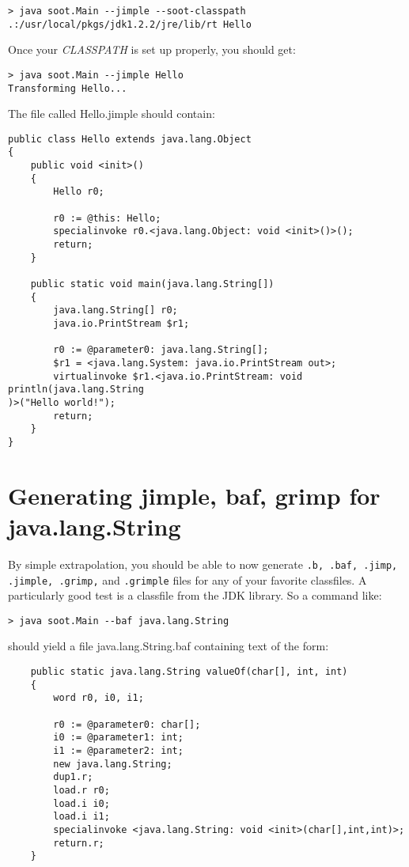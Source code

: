 \documentclass{article}
\begin{document}
\begin{verbatim}
> java soot.Main --jimple --soot-classpath .:/usr/local/pkgs/jdk1.2.2/jre/lib/rt Hello
\end{verbatim}


Once your {\em CLASSPATH} is set up properly, you should get:

\begin{verbatim}
> java soot.Main --jimple Hello
Transforming Hello...
\end{verbatim}

The file called Hello.jimple should contain:

\begin{verbatim}
public class Hello extends java.lang.Object
{
    public void <init>()
    {
        Hello r0;

        r0 := @this: Hello;
        specialinvoke r0.<java.lang.Object: void <init>()>();
        return;
    }

    public static void main(java.lang.String[])
    {
        java.lang.String[] r0;
        java.io.PrintStream $r1;

        r0 := @parameter0: java.lang.String[];
        $r1 = <java.lang.System: java.io.PrintStream out>;
        virtualinvoke $r1.<java.io.PrintStream: void println(java.lang.String
)>("Hello world!");
        return;
    }
}
\end{verbatim}

\section{Generating jimple, baf, grimp for java.lang.String}

By simple extrapolation, you should be able to now generate {\tt .b, .baf,
.jimp, .jimple, .grimp,} and {\tt .grimple} files for any of your favorite
classfiles.  A particularly good test is a classfile from the JDK
library.  So a command like:

\begin{verbatim}
> java soot.Main --baf java.lang.String
\end{verbatim}

should yield a file java.lang.String.baf containing text of the form:

\begin{verbatim}
    public static java.lang.String valueOf(char[], int, int)
    {
        word r0, i0, i1;

        r0 := @parameter0: char[];
        i0 := @parameter1: int;
        i1 := @parameter2: int;
        new java.lang.String;
        dup1.r;
        load.r r0;
        load.i i0;
        load.i i1;
        specialinvoke <java.lang.String: void <init>(char[],int,int)>;
        return.r;
    }
\end{verbatim}
\end{document}
